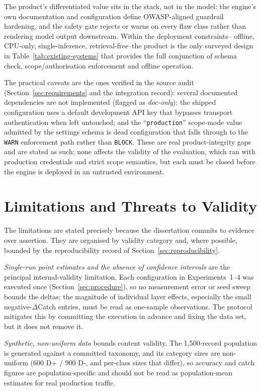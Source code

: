 The product's differentiated value sits in the stack, not in the model: the
engine's own documentation and configuration define OWASP-aligned guardrail
hardening, and the safety gate rejects or warns on every flaw class rather
than rendering model output downstream. Within the deployment constraints--
offline, CPU-only, single-inference, retrieval-free--the product is the only
surveyed design in Table~\ref{tab:existing-systems} that provides the full
conjunction of schema check, scope/authorisation enforcement and offline
operation.

The practical caveats are the ones verified in the source audit
(Section~\ref{sec:requirements} and the integration record): several documented
dependencies are not implemented (flagged as \emph{doc-only}); the shipped
configuration uses a default development API key that bypasses transport
authentication when left untouched; and the ``\texttt{production}''
scope-mode value admitted by the settings schema is dead configuration that
falls through to the \texttt{WARN} enforcement path rather than
\texttt{BLOCK}. These are real product-integrity gaps and are stated as such;
none affects the validity of the evaluation, which ran with production
credentials and strict scope semantics, but each must be closed before the
engine is deployed in an untrusted environment.

\section{Limitations and Threats to Validity}\label{sec:discussion-limitations}

The limitations are stated precisely because the dissertation commits to
evidence over assertion. They are organised by validity category and, where
possible, bounded by the reproducibility record of
Section~\ref{sec:reproducibility}.

\emph{Single-run point estimates and the absence of confidence intervals}
are the principal internal-validity limitation. Each configuration in
Experiments~1--4 was executed once (Section~\ref{sec:procedure}), so no
measurement error or seed sweep bounds the deltas; the magnitude of individual
layer effects, especially the small negative-$\Delta$Catch entries, must be
read as one-sample observations. The protocol mitigates this by committing the
execution in advance and fixing the data set, but it does not remove it.

\emph{Synthetic, non-uniform data} bounds content validity. The 1,500-record
population is generated against a committed taxonomy, and its category sizes
are non-uniform (600 D+ / 900 D-, and per-class sizes that differ), so accuracy
and catch figures are population-specific and should not be read as
population-mean estimates for real production traffic.

